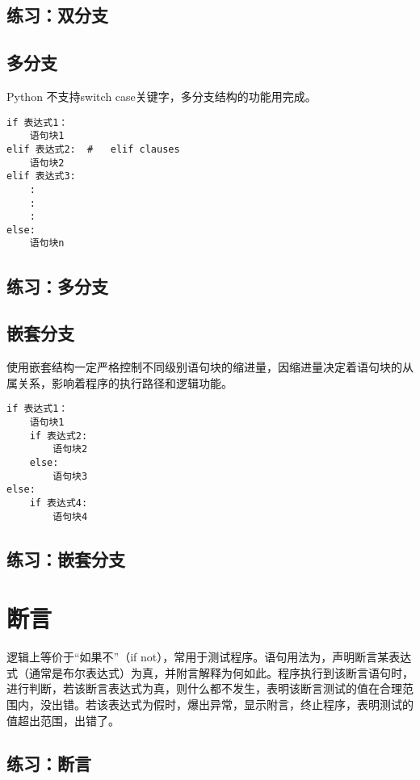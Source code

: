 \subsection{练习：双分支}
\subsection{多分支}
Python 不支持switch case关键字，多分支结构的功能用完成。
\begin{framed}
\begin{verbatim}
if 表达式1：
    语句块1
elif 表达式2:  #   elif clauses
    语句块2
elif 表达式3:
    :
    :
    :
else:
    语句块n
\end{verbatim}
\end{framed}
\subsection{练习：多分支}
\subsection{嵌套分支}
使用嵌套结构一定严格控制不同级别语句块的缩进量，因缩进量决定着语句块的从属关系，影响着程序的执行路径和逻辑功能。
\begin{framed}
\begin{verbatim}
if 表达式1：
    语句块1
    if 表达式2:
        语句块2
    else:
        语句块3
else:
    if 表达式4:
        语句块4
\end{verbatim}
\end{framed}
\subsection{练习：嵌套分支}

\section{断言}
逻辑上等价于“如果不”（if not），常用于测试程序。语句用法为，声明断言某表达式（通常是布尔表达式）为真，并附言解释为何如此。程序执行到该断言语句时，进行判断，若该断言表达式为真，则什么都不发生，表明该断言测试的值在合理范围内，没出错。若该表达式为假时，爆出异常，显示附言，终止程序，表明测试的值超出范围，出错了。
\subsection{练习：断言}
